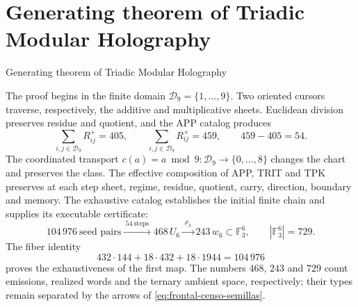 \chapter*{Generating theorem of Triadic Modular Holography}
%
{Generating theorem of Triadic Modular Holography}

The proof begins in the finite domain
\(\mathcal D_9=\{1,\ldots,9\}\). Two oriented cursors traverse,
respectively, the additive and multiplicative sheets. Euclidean division
preserves residue and quotient, and the APP catalog produces
\[
 \sum_{i,j\in\mathcal D_9}R^+_{ij}=405,
 \qquad
 \sum_{i,j\in\mathcal D_9}R^\times_{ij}=459,
 \qquad 459-405=54.
\]
The coordinated transport
\(c(a)=a\bmod9:\mathcal D_9\to\{0,\ldots,8\}\)
changes the chart and preserves the class. The effective composition of APP, TRIT and
TPK preserves at each step sheet, regime, residue, quotient, carry,
direction, boundary and memory. The exhaustive catalog establishes the initial finite
chain and supplies its executable certificate:
\begin{equation}
\boxed{
104\,976\ \text{seed pairs}
\xrightarrow{\;54\ \text{steps}\;}
468\,U_6
\xrightarrow{\;\rho_3\;}
243\,w_6\subset\mathbb F_3^6,
\qquad |\mathbb F_3^6|=729.}
\label{eq:frontal-censo-semillas}
\end{equation}
The fiber identity
\[
432\cdot144+18\cdot432+18\cdot1944=104\,976
\]
proves the exhaustiveness of the first map. The numbers \(468\), \(243\) and
\(729\) count emissions, realized words and the ternary ambient space,
respectively; their types remain separated by the arrows of
\eqref{eq:frontal-censo-semillas}.

